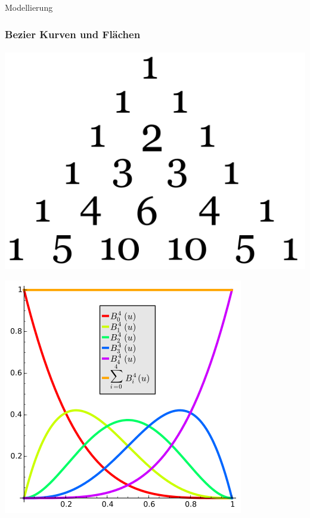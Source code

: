 \documentclass{beamer}
\begin{document}
\begin{frame}{Modellierung}
\frametitle{Bezier Kurven und Flächen}
\framesubtitle{}

\begin{center}
    \includegraphics[scale=0.2]{images/pascal.png}

    \includegraphics[scale=0.45]{images/Bernstein_Polynomials.png}
\end{center}
\end{frame}
\end{document}

